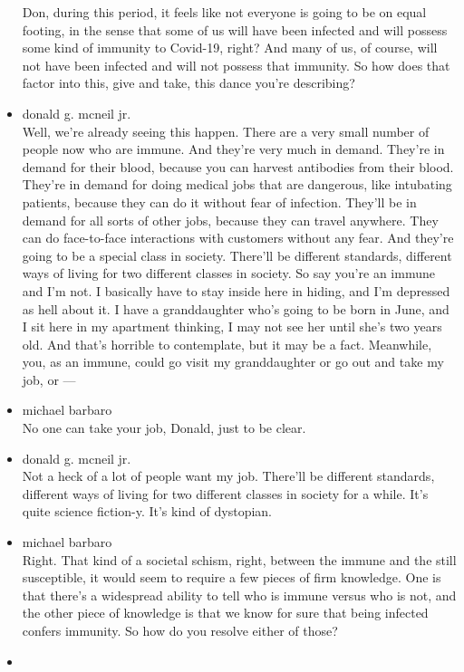 \begin{itemize}
  Don, during this period, it feels like not everyone is going to be on
  equal footing, in the sense that some of us will have been infected
  and will possess some kind of immunity to Covid-19, right? And many of
  us, of course, will not have been infected and will not possess that
  immunity. So how does that factor into this, give and take, this dance
  you're describing?
\item
  donald g. mcneil jr.\\
  Well, we're already seeing this happen. There are a very small number
  of people now who are immune. And they're very much in demand. They're
  in demand for their blood, because you can harvest antibodies from
  their blood. They're in demand for doing medical jobs that are
  dangerous, like intubating patients, because they can do it without
  fear of infection. They'll be in demand for all sorts of other jobs,
  because they can travel anywhere. They can do face-to-face
  interactions with customers without any fear. And they're going to be
  a special class in society. There'll be different standards, different
  ways of living for two different classes in society. So say you're an
  immune and I'm not. I basically have to stay inside here in hiding,
  and I'm depressed as hell about it. I have a granddaughter who's going
  to be born in June, and I sit here in my apartment thinking, I may not
  see her until she's two years old. And that's horrible to contemplate,
  but it may be a fact. Meanwhile, you, as an immune, could go visit my
  granddaughter or go out and take my job, or ---
\item
  michael barbaro\\
  No one can take your job, Donald, just to be clear.
\item
  donald g. mcneil jr.\\
  Not a heck of a lot of people want my job. There'll be different
  standards, different ways of living for two different classes in
  society for a while. It's quite science fiction-y. It's kind of
  dystopian.
\item
  michael barbaro\\
  Right. That kind of a societal schism, right, between the immune and
  the still susceptible, it would seem to require a few pieces of firm
  knowledge. One is that there's a widespread ability to tell who is
  immune versus who is not, and the other piece of knowledge is that we
  know for sure that being infected confers immunity. So how do you
  resolve either of those?
\item

\end{itemize}
